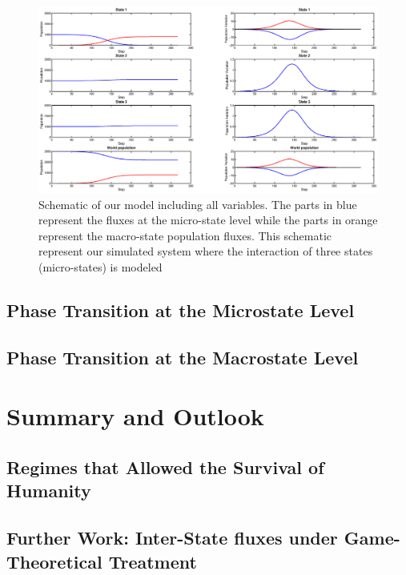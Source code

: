 \documentclass[11pt]{article} %
\begin{document}
\begin{figure}[h!]
\centerline{
\includegraphics[scale=0.35]{Images/example_exode.eps}}
\caption{Schematic of our model including all variables. The parts in blue represent the fluxes at the micro-state level while the parts in orange represent the macro-state population fluxes. This schematic represent our simulated system where the interaction of three states (micro-states) is modeled \label{exude} }
\end{figure}


\subsection{Phase Transition at the Microstate Level}\indent

\subsection{Phase Transition at the Macrostate Level}\indent


\section{Summary and Outlook}\indent

\subsection{Regimes that Allowed the Survival of Humanity}\indent


\subsection{Further Work: Inter-State fluxes under Game-Theoretical Treatment}\indent
\end{document}
